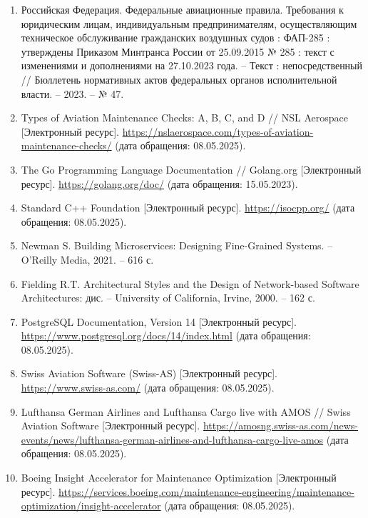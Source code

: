 \documentclass[14pt,a4paper]{extarticle}
\begin{document}
{\sloppy  %
\begin{enumerate}
\item Российская Федерация. Федеральные авиационные правила. Требования к юридическим лицам, индивидуальным предпринимателям, осуществляющим техническое обслуживание гражданских воздушных судов : ФАП-285 : утверждены Приказом Минтранса России от 25.09.2015 № 285 : текст с изменениями и дополнениями на 27.10.2023 года. -- Текст : непосредственный // Бюллетень нормативных актов федеральных органов исполнительной власти. -- 2023. -- № 47.

\item Types of Aviation Maintenance Checks: A, B, C, and D // NSL Aerospace [Электронный ресурс]. \url{https://nslaerospace.com/types-of-aviation-maintenance-checks/} (дата обращения: 08.05.2025).

\item The Go Programming Language Documentation // Golang.org [Электронный ресурс]. \url{https://golang.org/doc/} (дата обращения: 15.05.2023).

\item Standard C++ Foundation [Электронный ресурс]. \url{https://isocpp.org/} (дата обращения: 08.05.2025).

\item Newman S. Building Microservices: Designing Fine-Grained Systems. -- O'Reilly Media, 2021. -- 616 с.

\item Fielding R.T. Architectural Styles and the Design of Network-based Software Architectures: дис. -- University of California, Irvine, 2000. -- 162 с.

\item PostgreSQL Documentation, Version 14 [Электронный ресурс]. \url{https://www.postgresql.org/docs/14/index.html} (дата обращения: 08.05.2025).

\item Swiss Aviation Software (Swiss-AS) [Электронный ресурс]. \url{https://www.swiss-as.com/} (дата обращения: 08.05.2025).

\item Lufthansa German Airlines and Lufthansa Cargo live with AMOS // Swiss Aviation Software [Электронный ресурс]. \url{https://amosng.swiss-as.com/news-events/news/lufthansa-german-airlines-and-lufthansa-cargo-live-amos} (дата обращения: 08.05.2025).

\item Boeing Insight Accelerator for Maintenance Optimization [Электронный ресурс]. \url{https://services.boeing.com/maintenance-engineering/maintenance-optimization/insight-accelerator} (дата обращения: 08.05.2025).
\end{enumerate}
}  %
\clearpage
\end{document}
